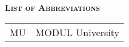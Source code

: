 %
%
% 
% 
% 

\noindent
{\Large\bfseries \textsc{List of Abbreviations}}
\vspace{0.65cm}

\begin{table*}[htbp]
		\begin{tabular}{ll}
			MU & MODUL University\\
		\end{tabular}
\end{table*}

	